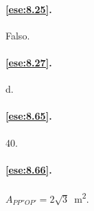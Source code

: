 \paragraph{\ref{ese:8.25}.}
Falso.

\paragraph{\ref{ese:8.27}.}
d.

\paragraph{\ref{ese:8.65}.}
40.

\paragraph{\ref{ese:8.66}.}
\(A_{PP''OP'}=2\sqrt{3}\)~m\textsuperscript{2}.

\endgroup
